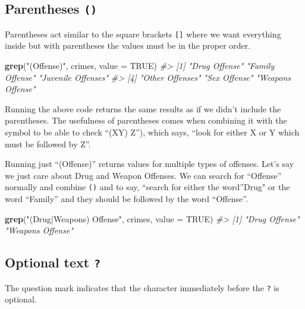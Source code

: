 \documentclass[
  12pt,
]{book}
\newenvironment{Shaded}{\begin{snugshade}}{\end{snugshade}}
\newcommand{\CommentTok}[1]{\textcolor[rgb]{0.37,0.37,0.37}{\textit{#1}}}
\newcommand{\DataTypeTok}[1]{\textcolor[rgb]{0.27,0.27,0.27}{#1}}
\newcommand{\KeywordTok}[1]{\textcolor[rgb]{0.27,0.27,0.27}{\textbf{#1}}}
\newcommand{\NormalTok}[1]{#1}
\newcommand{\OtherTok}[1]{\textcolor[rgb]{0.37,0.37,0.37}{#1}}
\newcommand{\StringTok}[1]{\textcolor[rgb]{0.5,0.5,0.5}{#1}}
\begin{document}
\hypertarget{parentheses}{%
\subsection{\texorpdfstring{Parentheses \texttt{()}}{Parentheses ()}}\label{parentheses}}

Parentheses act similar to the square brackets \texttt{{[}{]}} where we want everything inside but with parentheses the values must be in the proper order.

\begin{Shaded}
\begin{Highlighting}[]
\KeywordTok{grep}\NormalTok{(}\StringTok{"(Offense)"}\NormalTok{, crimes, }\DataTypeTok{value =} \OtherTok{TRUE}\NormalTok{)}
\CommentTok{\#> [1] "Drug Offense"      "Family Offense"    "Juvenile Offenses"}
\CommentTok{\#> [4] "Other Offenses"    "Sex Offense"       "Weapons Offense"}
\end{Highlighting}
\end{Shaded}

Running the above code returns the same results as if we didn't include the parentheses. The usefulness of parentheses comes when combining it with the \texttt{\textbar{}} symbol to be able to check ``(X\textbar Y) Z''), which says, ``look for either X or Y which must be followed by Z''.

Running just ``(Offense)'' returns values for multiple types of offenses. Let's say we just care about Drug and Weapon Offenses. We can search for ``Offense'' normally and combine \texttt{()} and \texttt{\textbar{}} to say, ``search for either the word''Drug" or the word ``Family'' and they should be followed by the word ``Offense''.

\begin{Shaded}
\begin{Highlighting}[]
\KeywordTok{grep}\NormalTok{(}\StringTok{"(Drug|Weapons) Offense"}\NormalTok{, crimes, }\DataTypeTok{value =} \OtherTok{TRUE}\NormalTok{)}
\CommentTok{\#> [1] "Drug Offense"    "Weapons Offense"}
\end{Highlighting}
\end{Shaded}

\hypertarget{optional-text}{%
\subsection{\texorpdfstring{Optional text \texttt{?}}{Optional text ?}}\label{optional-text}}

The question mark indicates that the character immediately before the \texttt{?} is optional.
\end{document}
